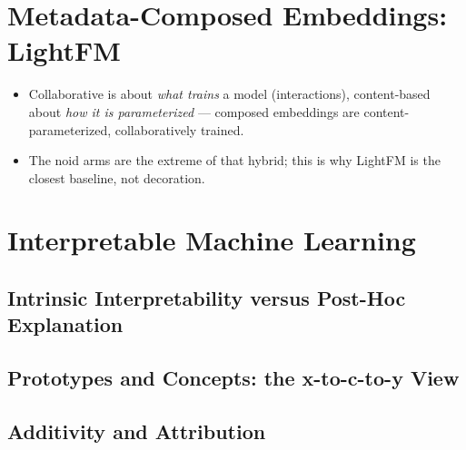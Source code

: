 \section{Metadata-Composed Embeddings: LightFM}
\label{sec:bg-lightfm}
\begin{itemize}
    \item Collaborative is about \emph{what trains} a model (interactions), content-based about \emph{how it is parameterized} — composed embeddings are content-parameterized, collaboratively trained.
    \item The noid arms are the extreme of that hybrid; this is why LightFM is the closest baseline, not decoration.
\end{itemize}

\section{Interpretable Machine Learning}
\label{sec:bg-iml}

\subsection{Intrinsic Interpretability versus Post-Hoc Explanation}
\label{sec:bg-iml-intrinsic}

\subsection{Prototypes and Concepts: the x-to-c-to-y View}
\label{sec:bg-iml-concepts}

\subsection{Additivity and Attribution}
\label{sec:bg-iml-additivity}
